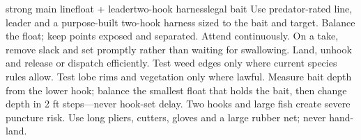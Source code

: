 
{{strong main line}{float + leader}{two-hook harness}{legal bait}}
{Use predator-rated line, leader and a purpose-built two-hook harness sized to
the bait and target. Balance the float; keep points exposed and separated.}
{Attend continuously. On a take, remove slack and set promptly rather than
waiting for swallowing. Land, unhook and release or dispatch efficiently.}
{Test weed edges only where current species rules allow.}
{Test lobe rims and vegetation only where lawful.}
{Measure bait depth from the lower hook; balance the smallest float that holds
the bait, then change depth in 2 ft steps---never hook-set delay.}
{Two hooks and large fish create severe puncture risk. Use long pliers, cutters,
gloves and a large rubber net; never hand-land.}
